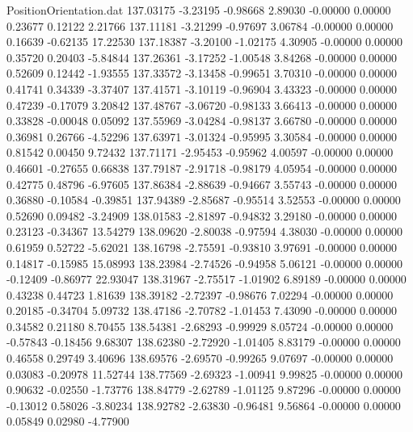 \begin{filecontents}{PositionOrientation.dat}
 137.03175   -3.23195   -0.98668     2.89030   -0.00000    0.00000    0.23677    0.12122    2.21766
 137.11181   -3.21299   -0.97697     3.06784   -0.00000    0.00000    0.16639   -0.62135   17.22530
 137.18387   -3.20100   -1.02175     4.30905   -0.00000    0.00000    0.35720    0.20403   -5.84844
 137.26361   -3.17252   -1.00548     3.84268   -0.00000    0.00000    0.52609    0.12442   -1.93555
 137.33572   -3.13458   -0.99651     3.70310   -0.00000    0.00000    0.41741    0.34339   -3.37407
 137.41571   -3.10119   -0.96904     3.43323   -0.00000    0.00000    0.47239   -0.17079    3.20842
 137.48767   -3.06720   -0.98133     3.66413   -0.00000    0.00000    0.33828   -0.00048    0.05092
 137.55969   -3.04284   -0.98137     3.66780   -0.00000    0.00000    0.36981    0.26766   -4.52296
 137.63971   -3.01324   -0.95995     3.30584   -0.00000    0.00000    0.81542    0.00450    9.72432
 137.71171   -2.95453   -0.95962     4.00597   -0.00000    0.00000    0.46601   -0.27655    0.66838
 137.79187   -2.91718   -0.98179     4.05954   -0.00000    0.00000    0.42775    0.48796   -6.97605
 137.86384   -2.88639   -0.94667     3.55743   -0.00000    0.00000    0.36880   -0.10584   -0.39851
 137.94389   -2.85687   -0.95514     3.52553   -0.00000    0.00000    0.52690    0.09482   -3.24909
 138.01583   -2.81897   -0.94832     3.29180   -0.00000    0.00000    0.23123   -0.34367   13.54279
 138.09620   -2.80038   -0.97594     4.38030   -0.00000    0.00000    0.61959    0.52722   -5.62021
 138.16798   -2.75591   -0.93810     3.97691   -0.00000    0.00000    0.14817   -0.15985   15.08993
 138.23984   -2.74526   -0.94958     5.06121   -0.00000    0.00000   -0.12409   -0.86977   22.93047
 138.31967   -2.75517   -1.01902     6.89189   -0.00000    0.00000    0.43238    0.44723    1.81639
 138.39182   -2.72397   -0.98676     7.02294   -0.00000    0.00000    0.20185   -0.34704    5.09732
 138.47186   -2.70782   -1.01453     7.43090   -0.00000    0.00000    0.34582    0.21180    8.70455
 138.54381   -2.68293   -0.99929     8.05724   -0.00000    0.00000   -0.57843   -0.18456    9.68307
 138.62380   -2.72920   -1.01405     8.83179   -0.00000    0.00000    0.46558    0.29749    3.40696
 138.69576   -2.69570   -0.99265     9.07697   -0.00000    0.00000    0.03083   -0.20978   11.52744
 138.77569   -2.69323   -1.00941     9.99825   -0.00000    0.00000    0.90632   -0.02550   -1.73776
 138.84779   -2.62789   -1.01125     9.87296   -0.00000    0.00000   -0.13012    0.58026   -3.80234
 138.92782   -2.63830   -0.96481     9.56864   -0.00000    0.00000    0.05849    0.02980   -4.77900

\end{filecontents}
